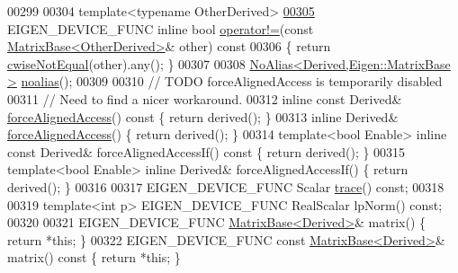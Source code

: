 \begin{DoxyCode}
00299 
00304     \textcolor{keyword}{template}<\textcolor{keyword}{typename} OtherDerived>
\hyperlink{group___core___module_a932a37b58d2bad69849a3a8809aaffac}{00305}     EIGEN\_DEVICE\_FUNC \textcolor{keyword}{inline} \textcolor{keywordtype}{bool} \hyperlink{group___core___module_a932a37b58d2bad69849a3a8809aaffac}{operator!=}(\textcolor{keyword}{const} 
      \hyperlink{group___core___module_class_eigen_1_1_matrix_base}{MatrixBase<OtherDerived>}& other)\textcolor{keyword}{ const}
00306 \textcolor{keyword}{    }\{ \textcolor{keywordflow}{return} \hyperlink{group___core___module_a78d22ea009bdb12a0988a1c2cb5252b2}{cwiseNotEqual}(other).any(); \}
00307 
00308     \hyperlink{group___core___module_class_eigen_1_1_no_alias}{NoAlias<Derived,Eigen::MatrixBase >} 
      \hyperlink{group___core___module_a2c1085de7645f23f240876388457da0b}{noalias}();
00309 
00310     \textcolor{comment}{// TODO forceAlignedAccess is temporarily disabled}
00311     \textcolor{comment}{// Need to find a nicer workaround.}
00312     \textcolor{keyword}{inline} \textcolor{keyword}{const} Derived& \hyperlink{group___core___module_ad2fdb842d9a715f8778d0b33c29cfe49}{forceAlignedAccess}()\textcolor{keyword}{ const }\{ \textcolor{keywordflow}{return} derived(); \}
00313     \textcolor{keyword}{inline} Derived& \hyperlink{group___core___module_ad2fdb842d9a715f8778d0b33c29cfe49}{forceAlignedAccess}() \{ \textcolor{keywordflow}{return} derived(); \}
00314     \textcolor{keyword}{template}<\textcolor{keywordtype}{bool} Enable> \textcolor{keyword}{inline} \textcolor{keyword}{const} Derived& forceAlignedAccessIf()\textcolor{keyword}{ const }\{ \textcolor{keywordflow}{return} derived(); \}
00315     \textcolor{keyword}{template}<\textcolor{keywordtype}{bool} Enable> \textcolor{keyword}{inline} Derived& forceAlignedAccessIf() \{ \textcolor{keywordflow}{return} derived(); \}
00316 
00317     EIGEN\_DEVICE\_FUNC Scalar \hyperlink{group___core___module_a2cc7a95b161f3a660bdb8ff048b44161}{trace}() \textcolor{keyword}{const};
00318 
00319     \textcolor{keyword}{template}<\textcolor{keywordtype}{int} p> EIGEN\_DEVICE\_FUNC RealScalar lpNorm() \textcolor{keyword}{const};
00320 
00321     EIGEN\_DEVICE\_FUNC \hyperlink{group___core___module_class_eigen_1_1_matrix_base}{MatrixBase<Derived>}& matrix() \{ \textcolor{keywordflow}{return} *\textcolor{keyword}{this}; \}
00322     EIGEN\_DEVICE\_FUNC \textcolor{keyword}{const} \hyperlink{group___core___module_class_eigen_1_1_matrix_base}{MatrixBase<Derived>}& matrix()\textcolor{keyword}{ const }\{ \textcolor{keywordflow}{return} *\textcolor{keyword}{this}; \}

\end{DoxyCode}
